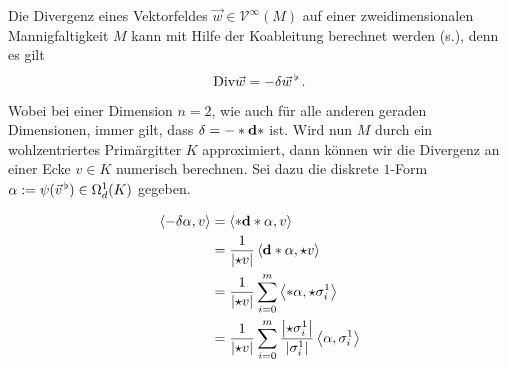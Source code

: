   \begin{beispiel}[Divergenz]
    Die Divergenz eines Vektorfeldes \( \vec{w}\in\mathcal{V}^{\infty}(M) \) auf einer zweidimensionalen Mannigfaltigkeit \( M \) kann mit Hilfe 
    der Koableitung berechnet werden (s.\cite{Marsden}), denn es gilt
    \begin{align}
      \text{Div}\vec{w} = -\delta\vec{w}^{\,\flat} \,\text{.}
    \end{align}
    Wobei bei einer Dimension \( n=2 \), wie auch für alle anderen geraden Dimensionen, immer gilt, dass \( \delta = -*\mathbf{d} * \) ist.
    Wird nun \( M \) durch ein wohlzentriertes Primärgitter \( K \) approximiert, dann können wir die Divergenz an einer Ecke \( v\in K \) numerisch berechnen.
    Sei dazu die diskrete \( 1 \)-Form 
    \( \alpha:=\psi(\vec{v}^{\,\flat})\in\Omega_{d}^{1}(K) \)
    gegeben.\\
    \begin{minipage}[b]{0.3\textwidth}
        \centering
    \end{minipage}
    \hfill
    \begin{minipage}[b]{0.6\textwidth}
    \begin{align}
    \begin{aligned}
      \left\langle -\delta\alpha,v \right\rangle
          &= \left\langle *\mathbf{d} * \alpha , v \right\rangle \\
          &= \frac{1}{\left| \star v \right|} \left\langle \mathbf{d} * \alpha , \star v \right\rangle \\
          &= \frac{1}{\left| \star v \right|} \sum_{i=0}^{m} \left\langle *\alpha , \star\sigma^{1}_{i} \right\rangle \\
          &= \frac{1}{\left| \star v \right|} \sum_{i=0}^{m} \frac{\left| \star\sigma^{1}_{i} \right|}{\left|\sigma^{1}_{i} \right|}
                                                              \left\langle \alpha , \sigma^{1}_{i} \right\rangle
    \end{aligned}
    \end{align}
    \end{minipage}
  \end{beispiel}

